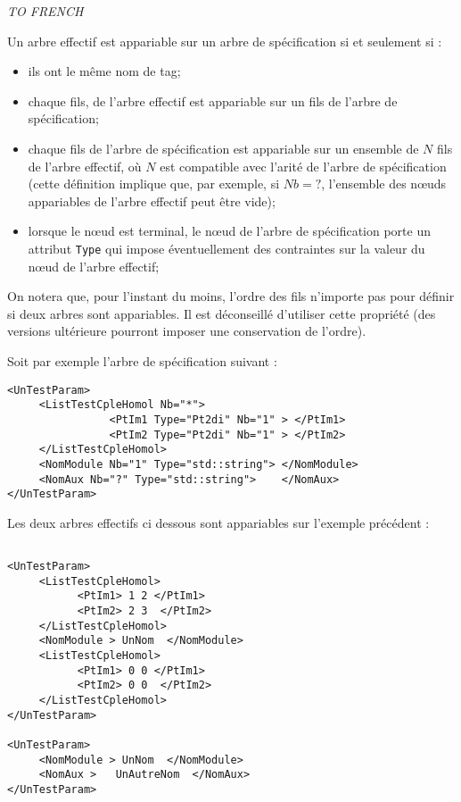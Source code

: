 \begin{center}
    \emph{ TO FRENCH}
\end{center}



Un arbre effectif est appariable sur un arbre de sp\'ecification si et
seulement si :

\begin{itemize}
   \item ils ont le m\^eme nom de tag;
   \item chaque fils, de l'arbre effectif est appariable sur un  fils de l'arbre
         de sp\'ecification;
   \item chaque fils de l'arbre de sp\'ecification est appariable
         sur un ensemble de $N$ fils de l'arbre
         effectif,  o\`u $N$ est compatible avec l'arit\'e de l'arbre de sp\'ecification
         (cette d\'efinition implique que, par exemple, si $Nb=?$, l'ensemble des
           n\oe{}uds  appariables de l'arbre effectif peut \^etre vide);
   \item  lorsque le  n\oe{}ud est terminal, le  n\oe{}ud de l'arbre de sp\'ecification
          porte un attribut {\tt Type} qui impose \'eventuellement des contraintes sur
          la valeur du n\oe{}ud  de l'arbre effectif;
\end{itemize}

On notera que, pour l'instant du moins, l'ordre des fils n'importe
pas pour d\'efinir si deux arbres sont appariables.  Il est 
d\'econseill\'e d'utiliser cette propri\'et\'e (des versions 
ult\'erieure pourront imposer une conservation de l'ordre).

Soit par exemple l'arbre de sp\'ecification suivant :

\begin{verbatim}
<UnTestParam>
     <ListTestCpleHomol Nb="*">
                <PtIm1 Type="Pt2di" Nb="1" > </PtIm1>
                <PtIm2 Type="Pt2di" Nb="1" > </PtIm2>
     </ListTestCpleHomol>
     <NomModule Nb="1" Type="std::string"> </NomModule>
     <NomAux Nb="?" Type="std::string">    </NomAux>
</UnTestParam>
\end{verbatim}



Les deux arbres effectifs ci dessous sont appariables sur l'exemple
pr\'ec\'edent :

\begin{verbatim}

<UnTestParam>
     <ListTestCpleHomol>
           <PtIm1> 1 2 </PtIm1>
           <PtIm2> 2 3  </PtIm2>
     </ListTestCpleHomol>
     <NomModule > UnNom  </NomModule>
     <ListTestCpleHomol>
           <PtIm1> 0 0 </PtIm1>
           <PtIm2> 0 0  </PtIm2>
     </ListTestCpleHomol>
</UnTestParam>

<UnTestParam>
     <NomModule > UnNom  </NomModule>
     <NomAux >   UnAutreNom  </NomAux>
</UnTestParam>

\end{verbatim}

